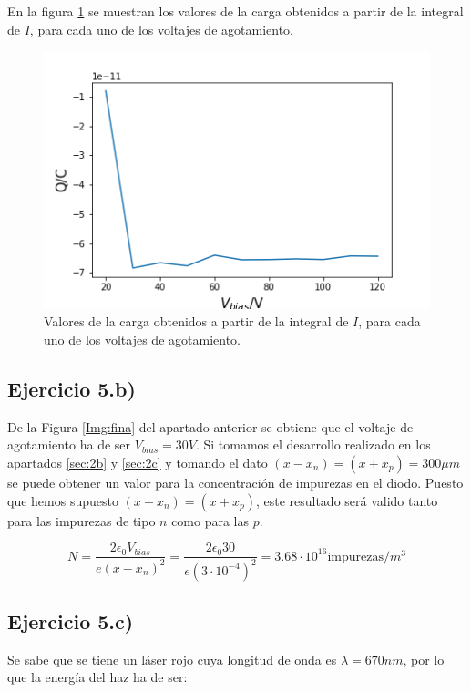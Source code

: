 \documentclass[twoside]{article}
\begin{document}
			En la figura \ref{Img:Q} se muestran los valores de la carga obtenidos a partir de la integral de $I$, para cada uno de los voltajes de agotamiento.

				\begin{figure}[H]
					\centering
					\includegraphics[scale=0.8]{Q.png}
					\caption{\label{Img:Q}Valores de la carga obtenidos a partir de la integral de $I$, para cada uno de los voltajes de agotamiento.}
				\end{figure}

		\subsection{Ejercicio 5.b)}

			De la Figura \ref{Img:fina} del apartado anterior se obtiene que el voltaje de agotamiento ha de ser $V_{bias} = 30 V$. Si tomamos el desarrollo realizado en los apartados \ref{sec:2b} y \ref{sec:2c} y  tomando el dato $(x - x_n) = (x + x_p) = 300 \mu m$ se puede obtener un valor para la concentración de impurezas en el diodo. Puesto que hemos supuesto $(x - x_n) = (x + x_p)$, este resultado será valido tanto para las impurezas de tipo $n$ como  para las $p$.

				\begin{equation}
					N = \frac{2\epsilon_0 V_{bias}}{e(x - x_n)^2} = \frac{2\epsilon_0 30}{e(3 \cdot 10^{-4})^2} = 3.68 \cdot 10^{16} \textrm{impurezas} / m^3
				\end{equation}

		\subsection{Ejercicio 5.c)}

			Se sabe que se tiene un láser rojo cuya longitud de onda es $\lambda = 670 nm$, por lo que la energía del haz ha de ser:
\end{document}
